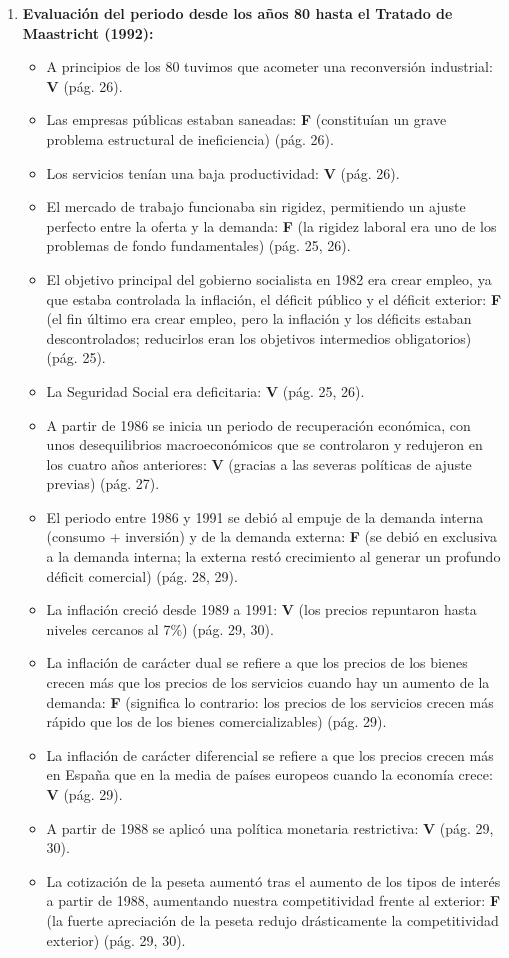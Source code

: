 \begin{enumerate}[label=\arabic*.]
    \item \textbf{Evaluación del periodo desde los años 80 hasta el Tratado de Maastricht (1992):}
    \begin{itemize}
        \item A principios de los 80 tuvimos que acometer una reconversión industrial: \textbf{V} (pág. 26).
        \item Las empresas públicas estaban saneadas: \textbf{F} (constituían un grave problema estructural de ineficiencia) (pág. 26).
        \item Los servicios tenían una baja productividad: \textbf{V} (pág. 26).
        \item El mercado de trabajo funcionaba sin rigidez, permitiendo un ajuste perfecto entre la oferta y la demanda: \textbf{F} (la rigidez laboral era uno de los problemas de fondo fundamentales) (pág. 25, 26).
        \item El objetivo principal del gobierno socialista en 1982 era crear empleo, ya que estaba controlada la inflación, el déficit público y el déficit exterior: \textbf{F} (el fin último era crear empleo, pero la inflación y los déficits estaban descontrolados; reducirlos eran los objetivos intermedios obligatorios) (pág. 25).
        \item La Seguridad Social era deficitaria: \textbf{V} (pág. 25, 26).
        \item A partir de 1986 se inicia un periodo de recuperación económica, con unos desequilibrios macroeconómicos que se controlaron y redujeron en los cuatro años anteriores: \textbf{V} (gracias a las severas políticas de ajuste previas) (pág. 27).
        \item El periodo entre 1986 y 1991 se debió al empuje de la demanda interna (consumo + inversión) y de la demanda externa: \textbf{F} (se debió en exclusiva a la demanda interna; la externa restó crecimiento al generar un profundo déficit comercial) (pág. 28, 29).
        \item La inflación creció desde 1989 a 1991: \textbf{V} (los precios repuntaron hasta niveles cercanos al 7\%) (pág. 29, 30).
        \item La inflación de carácter dual se refiere a que los precios de los bienes crecen más que los precios de los servicios cuando hay un aumento de la demanda: \textbf{F} (significa lo contrario: los precios de los servicios crecen más rápido que los de los bienes comercializables) (pág. 29).
        \item La inflación de carácter diferencial se refiere a que los precios crecen más en España que en la media de países europeos cuando la economía crece: \textbf{V} (pág. 29).
        \item A partir de 1988 se aplicó una política monetaria restrictiva: \textbf{V} (pág. 29, 30).
        \item La cotización de la peseta aumentó tras el aumento de los tipos de interés a partir de 1988, aumentando nuestra competitividad frente al exterior: \textbf{F} (la fuerte apreciación de la peseta redujo drásticamente la competitividad exterior) (pág. 29, 30).
    \end{itemize}


\end{enumerate}
